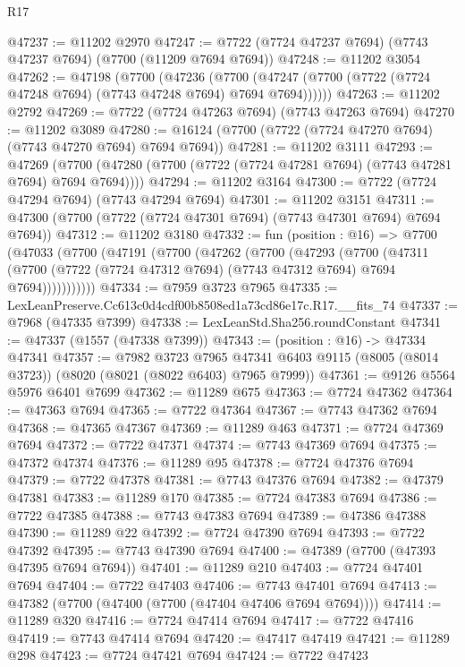 \begin{lexlean}{R17}
\begin{coremodule}
@47237 := @11202 @2970
@47247 := @7722 (@7724 @47237 @7694) (@7743 @47237 @7694) (@7700 (@11209 @7694 @7694))
@47248 := @11202 @3054
@47262 := @47198
    (@7700
      (@47236
        (@7700 (@47247 (@7700 (@7722 (@7724 @47248 @7694) (@7743 @47248 @7694) @7694 @7694))))))
@47263 := @11202 @2792
@47269 := @7722 (@7724 @47263 @7694) (@7743 @47263 @7694)
@47270 := @11202 @3089
@47280 := @16124 (@7700 (@7722 (@7724 @47270 @7694) (@7743 @47270 @7694) @7694 @7694))
@47281 := @11202 @3111
@47293 := @47269
    (@7700 (@47280 (@7700 (@7722 (@7724 @47281 @7694) (@7743 @47281 @7694) @7694 @7694))))
@47294 := @11202 @3164
@47300 := @7722 (@7724 @47294 @7694) (@7743 @47294 @7694)
@47301 := @11202 @3151
@47311 := @47300 (@7700 (@7722 (@7724 @47301 @7694) (@7743 @47301 @7694) @7694 @7694))
@47312 := @11202 @3180
@47332 := fun (position : @16) =>
  @7700
    (@47033
      (@7700
        (@47191
          (@7700
            (@47262
              (@7700
                (@47293
                  (@7700
                    (@47311
                      (@7700 (@7722 (@7724 @47312 @7694) (@7743 @47312 @7694) @7694 @7694)))))))))))
@47334 := @7959 @3723 @7965
@47335 := LexLeanPreserve.Cc613c0d4cdf00b8508ed1a73cd86e17c.R17.__fits_74
@47337 := @7968 (@47335 @7399)
@47338 := LexLeanStd.Sha256.roundConstant
@47341 := @47337 (@1557 (@47338 @7399))
@47343 := (position : @16) -> @47334 @47341
@47357 := @7982
    @3723
    @7965
    @47341
    @6403
    @9115
    (@8005 (@8014 @3723))
    (@8020 (@8021 (@8022 @6403) @7965 @7999))
@47361 := @9126 @5564 @5976 @6401 @7699
@47362 := @11289 @675
@47363 := @7724 @47362
@47364 := @47363 @7694
@47365 := @7722 @47364
@47367 := @7743 @47362 @7694
@47368 := @47365 @47367
@47369 := @11289 @463
@47371 := @7724 @47369 @7694
@47372 := @7722 @47371
@47374 := @7743 @47369 @7694
@47375 := @47372 @47374
@47376 := @11289 @95
@47378 := @7724 @47376 @7694
@47379 := @7722 @47378
@47381 := @7743 @47376 @7694
@47382 := @47379 @47381
@47383 := @11289 @170
@47385 := @7724 @47383 @7694
@47386 := @7722 @47385
@47388 := @7743 @47383 @7694
@47389 := @47386 @47388
@47390 := @11289 @22
@47392 := @7724 @47390 @7694
@47393 := @7722 @47392
@47395 := @7743 @47390 @7694
@47400 := @47389 (@7700 (@47393 @47395 @7694 @7694))
@47401 := @11289 @210
@47403 := @7724 @47401 @7694
@47404 := @7722 @47403
@47406 := @7743 @47401 @7694
@47413 := @47382 (@7700 (@47400 (@7700 (@47404 @47406 @7694 @7694))))
@47414 := @11289 @320
@47416 := @7724 @47414 @7694
@47417 := @7722 @47416
@47419 := @7743 @47414 @7694
@47420 := @47417 @47419
@47421 := @11289 @298
@47423 := @7724 @47421 @7694
@47424 := @7722 @47423

\end{coremodule}
\end{lexlean}

